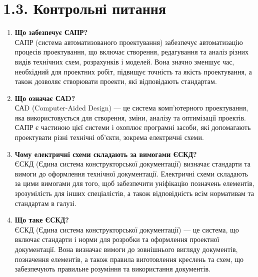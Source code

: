 \documentclass[a4paper]{article}
\begin{document}
    \section*{1.3. Контрольні питання}
    \begin{enumerate}
        \item \textbf{Що забезпечує САПР?} \\
        САПР (система автоматизованого проектування) забезпечує автоматизацію процесів проектування, 
        що включає створення, редагування та аналіз різних видів технічних схем, розрахунків і моделей. 
        Вона значно зменшує час, необхідний для проектних робіт, підвищує точність та якість проектування, 
        а також дозволяє створювати проекти, які відповідають стандартам.

        \item \textbf{Що означає САD?} \\
        САD (Computer-Aided Design) — це система комп'ютерного проектування, яка використовується для 
        створення, зміни, аналізу та оптимізації проектів. САПР є частиною цієї системи і охоплює програмні 
        засоби, які допомагають проектувати різні технічні об'єкти, зокрема електричні схеми.

        \item \textbf{Чому електричні схеми складають за вимогами ЄСКД?} \\
        ЄСКД (Єдина система конструкторської документації) визначає стандарти та вимоги до оформлення 
        технічної документації. Електричні схеми складають за цими вимогами для того, щоб забезпечити 
        уніфікацію позначень елементів, зрозумілість для інших спеціалістів, а також відповідність всім 
        нормативам та стандартам в галузі.

        \item \textbf{Що таке ЄСКД?} \\
        ЄСКД (Єдина система конструкторської документації) — це система, що включає стандарти і норми 
        для розробки та оформлення проектної документації. Вона визначає вимоги до зовнішнього вигляду 
        документів, позначення елементів, а також правила виготовлення креслень та схем, що забезпечують 
        правильне розуміння та використання документів.
    \end{enumerate}
\end{document}
